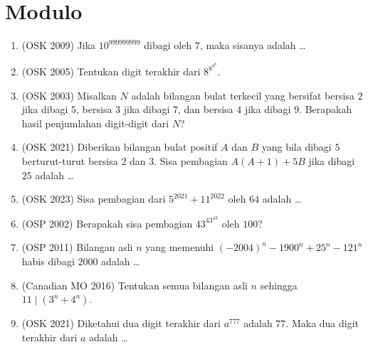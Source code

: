 \documentclass[12pt]{scrartcl}
\begin{document}
\section{Modulo}
\begin{enumerate}[resume]

	\item (OSK 2009)
	Jika $10^{999999999}$ dibagi oleh $7$, maka sisanya adalah \dots

	\item (OSK 2005)
	Tentukan digit terakhir dari $8^{8^{8^8}}$.

	\item (OSK 2003)
	Misalkan $N$ adalah bilangan bulat terkecil yang bersifat bersisa $2$ jika dibagi $5$,
	bersisa $3$ jika dibagi $7$, dan bersisa $4$ jika dibagi $9$.
	Berapakah hasil penjumlahan digit-digit dari $N$?

	\item (OSK 2021)
	Diberikan bilangan bulat positif $A$ dan $B$ yang bila dibagi $5$ berturut-turut bersisa $2$ dan $3$.
	Sisa pembagian $A(A + 1) + 5B$ jika dibagi $25$ adalah \dots

	\item (OSK 2023)
	Sisa pembagian dari $5^{2021} + 11^{2022}$ oleh $64$ adalah \dots

	\item (OSP 2002)
	Berapakah sisa pembagian $43^{43^{43}}$ oleh $100$?

	\item (OSP 2011)
	Bilangan asli $n$ yang memenuhi $(-2004)^n - 1900^n + 25^n - 121^n$ habis dibagi $2000$ adalah \dots

	\item (Canadian MO 2016)
	Tentukan semua bilangan asli $n$ sehingga $11 \mid (3^n + 4^n)$.

	\item (OSK 2021)
	Diketahui dua digit terakhir dari $a^{777}$ adalah $77$.
	Maka dua digit terakhir dari $a$ adalah \dots


\end{enumerate}
\end{document}
